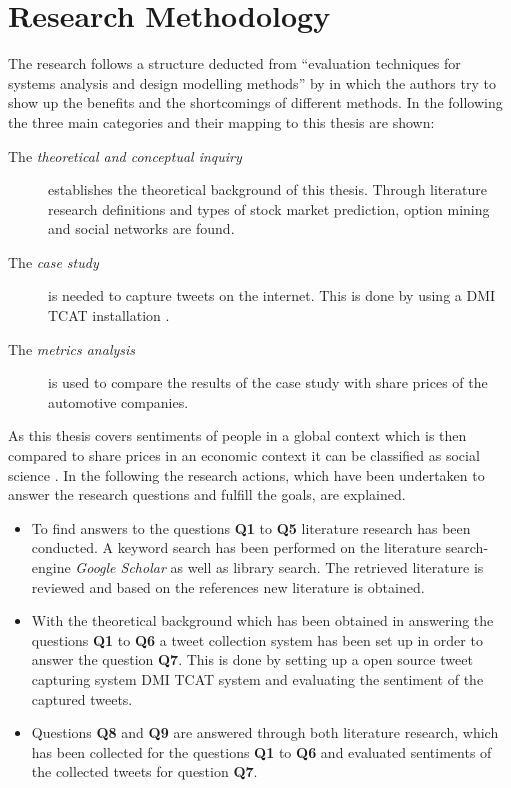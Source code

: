 \section{Research Methodology}
\label{s:introduction-researchmethodology}

The research follows a structure deducted from ``evaluation techniques for systems analysis and design modelling methods'' by \citet{Siau2011} in which the authors try to show up the benefits and the shortcomings of different methods.
In the following the three main categories and their mapping to this thesis are shown:

\begin{description}
	\item[The \emph{theoretical and conceptual inquiry}] {
		establishes the theoretical background of this thesis.
		Through literature research definitions and types of stock market prediction, option mining and social networks are found.
	}
	
	\item[The \emph{case study}] {
		is needed to capture tweets on the internet.
		This is done by using a DMI TCAT installation
		\cite{Borra2014}.
	}
	
	\item[The \emph{metrics analysis}] {
		is used to compare the results of the case study with share prices of the automotive companies.
	}
\end{description}

As this thesis covers sentiments of people in a global context which is then compared to share prices in an economic context it can be classified as social science \citep{Recker2013}.
In the following the research actions, which have been undertaken to answer the research questions and fulfill the goals, are explained.

\begin{itemize}
	\item To find answers to the questions \textbf{Q1} to \textbf{Q5} literature research has been conducted.
	A keyword search has been performed on the literature search-engine \emph{Google Scholar} as well as library search.
	The retrieved literature is reviewed and based on the references new literature is obtained.
	
	\item With the theoretical background which has been obtained in answering the questions \textbf{Q1} to \textbf{Q6} a tweet collection system has been set up in order to answer the question \textbf{Q7}.
	This is done by setting up a open source tweet capturing system DMI TCAT system and evaluating the sentiment of the captured tweets.
	
	\item Questions \textbf{Q8} and \textbf{Q9} are answered through both literature research, which has been collected for the questions \textbf{Q1} to \textbf{Q6} and evaluated sentiments of the collected tweets for question \textbf{Q7}.
\end{itemize}

